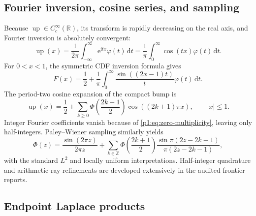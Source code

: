 \documentclass[11pt,oneside]{article}
\theoremstyle{definition}
\newcommand{\dd}{\,\mathrm d}
\newcommand{\e}{\mathrm e}
\newcommand{\ii}{\mathrm i}
\newcommand{\R}{\mathbb R}
\newcommand{\Z}{\mathbb Z}
\newcommand{\Up}{\operatorname{up}}
\newcommand{\PhiF}{\Phi}
\newcommand{\phiF}{\varphi}
\begin{document}
\subsection{Fourier inversion, cosine series, and sampling}

Because \(\Up\in C_c^\infty(\R)\), its transform is rapidly decreasing on the real
axis, and Fourier inversion is absolutely convergent:
\begin{equation}
 \Up(x)=\frac1{2\pi}\int_{-\infty}^{\infty}
 \e^{\ii tx}\phiF(t)\dd t
 =\frac1\pi\int_0^\infty\cos(tx)\phiF(t)\dd t.
 \label{p1:eq:up-fourier-inversion}
\end{equation}
For \(0<x<1\), the symmetric CDF inversion formula gives
\begin{equation}
 F(x)=\frac12+\frac1\pi\int_0^\infty
 \frac{\sin((2x-1)t)}{t}\phiF(t)\dd t.
 \label{p1:eq:F-sine-inversion}
\end{equation}
The period-two cosine expansion of the compact bump is
\begin{equation}
 \Up(x)=\frac12+
 \sum_{k\ge0}\PhiF\!\left(\frac{2k+1}{2}\right)
 \cos((2k+1)\pi x),\qquad |x|\le1.
 \label{p1:eq:half-integer-cosine}
\end{equation}
Integer Fourier coefficients vanish because of \eqref{p1:eq:zero-multiplicity}, leaving
only half-integers.  Paley--Wiener sampling similarly yields
\begin{equation}
 \PhiF(z)=\frac{\sin(2\pi z)}{2\pi z}+
 \sum_{k\in\Z}\PhiF\!\left(\frac{2k+1}{2}\right)
 \frac{\sin\pi(2z-2k-1)}{\pi(2z-2k-1)},
 \label{p1:eq:shannon}
\end{equation}
with the standard \(L^2\) and locally uniform interpretations.  Half-integer
quadrature and arithmetic-ray refinements are developed extensively in the audited
frontier reports.

\subsection{Endpoint Laplace products}
\end{document}
